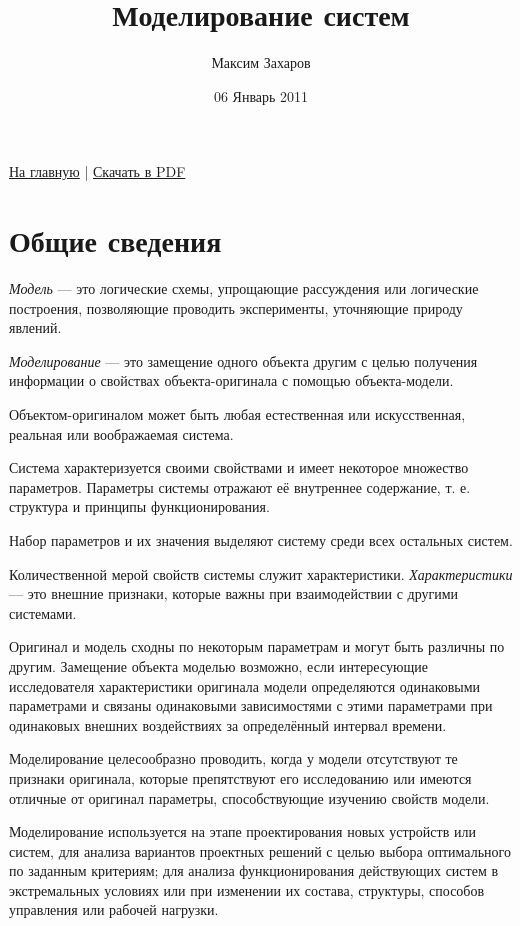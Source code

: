 \documentclass[12pt, russian, oneside, article]{ncc}
\begin{document}
\title{Моделирование систем}
\author{Максим Захаров}
\date{06 Январь 2011}
\maketitle

\setcounter{tocdepth}{3}
\tableofcontents
\vspace*{1cm}


\href{file:///home/maxim/Documents/Git/lectures/index.org}{На главную} | \href{file:///home/maxim/Documents/Git/lectures/other/MS_Lectures.pdf}{Скачать в PDF}

\section{Общие сведения}
\label{sec-1}


\emph{Модель} --- это логические схемы, упрощающие рассуждения или логические построения, позволяющие проводить эксперименты, уточняющие природу явлений.

\emph{Моделирование} --- это замещение одного объекта другим с целью получения информации о свойствах объекта-оригинала с помощью объекта-модели.

Объектом-оригиналом может быть любая естественная или искусственная, реальная или воображаемая система.

Система характеризуется своими свойствами и имеет некоторое множество параметров. Параметры системы отражают её внутреннее содержание, т. е. структура и принципы функционирования.

Набор параметров и их значения выделяют систему среди всех остальных систем.

Количественной мерой свойств системы служит характеристики. \emph{Характеристики} --- это внешние признаки, которые важны при взаимодействии с другими системами.

Оригинал и модель сходны по некоторым параметрам и могут быть различны по другим. Замещение объекта моделью возможно, если интересующие исследователя характеристики оригинала модели определяются одинаковыми параметрами и связаны одинаковыми зависимостями с этими параметрами при одинаковых внешних воздействиях за определённый интервал времени.

Моделирование целесообразно проводить, когда у модели отсутствуют те признаки оригинала, которые препятствуют его исследованию или имеются отличные от оригинал параметры, способствующие изучению свойств модели.

Моделирование используется на этапе проектирования новых устройств или систем, для анализа вариантов проектных решений с целью выбора оптимального по заданным критериям; для анализа функционирования действующих систем в экстремальных условиях или при изменении их состава, структуры, способов управления или рабочей нагрузки.
\end{document}
